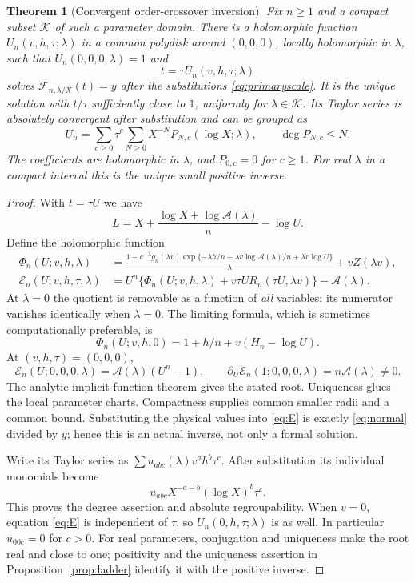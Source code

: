 \documentclass[11pt,a4paper]{article}
\numberwithin{equation}{section}
\newtheorem{theorem}{Theorem}[section]
\theoremstyle{definition}\newtheorem{definition}[theorem]{Definition}
\theoremstyle{remark}\newtheorem{remark}[theorem]{Remark}
\newcommand{\F}{\mathcal F}\newcommand{\B}{\mathcal B}
\newcommand{\A}{\mathcal A}\newcommand{\E}{\mathcal E}
\begin{document}
\begin{theorem}[Convergent order-crossover inversion]\label{thm:primary}
Fix $n\ge1$ and a compact subset $\mathscr K$ of such a parameter domain.
There is a holomorphic function $U_n(v,h,\tau;\lambda)$ in a common
polydisk around $(0,0,0)$, locally holomorphic in $\lambda$, such that
$U_n(0,0,0;\lambda)=1$ and
\begin{equation}\label{eq:primaryinverse}
 t=\tau U_n(v,h,\tau;\lambda)
\end{equation}
solves $\F_{n,\lambda/X}(t)=y$ after the substitutions
\eqref{eq:primaryscale}. It is the unique solution with $t/\tau$ sufficiently
close to $1$, uniformly for $\lambda\in\mathscr K$.
Its Taylor series is absolutely convergent after substitution and can be
grouped as
\begin{equation}\label{eq:primarysectors}
 U_n=\sum_{c\ge0}\tau^c\sum_{N\ge0}X^{-N}
           P_{N,c}(\log X;\lambda),\qquad \deg P_{N,c}\le N.
\end{equation}
The coefficients are holomorphic in $\lambda$, and $P_{0,c}=0$ for $c\ge1$.
For real $\lambda$ in a compact interval this is the unique small positive
inverse.
\end{theorem}
\begin{proof}
With $t=\tau U$ we have
\[
 L=X+\frac{\log X+\log\A(\lambda)}n-\log U.
\]
Define the holomorphic function
\begin{align}
 \Phi_n(U;v,h,\lambda)
 &=\frac{1-e^{-\lambda}g_n(\lambda v)
       \exp\{-\lambda h/n-\lambda v\log\A(\lambda)/n
                          +\lambda v\log U\}}{\lambda}
       +vZ(\lambda v),\label{eq:Phi}\\
 \E_n(U;v,h,\tau,\lambda)
 &=U^n\{\Phi_n(U;v,h,\lambda)
               +v\tau U R_n(\tau U,\lambda v)\}-\A(\lambda).
 \label{eq:E}
\end{align}
At $\lambda=0$ the quotient is removable as a function of \emph{all}
variables: its numerator vanishes identically when $\lambda=0$. The
limiting formula, which is sometimes computationally preferable, is
\begin{equation}\label{eq:Phi0}
 \Phi_n(U;v,h,0)=1+h/n+v(H_n-\log U).
\end{equation}
At $(v,h,\tau)=(0,0,0)$,
\[
 \E_n(U;0,0,0,\lambda)=\A(\lambda)(U^n-1),\qquad
 \partial_U\E_n(1;0,0,0,\lambda)=n\A(\lambda)\ne0.
\]
The analytic implicit-function theorem gives the stated root. Uniqueness
glues the local parameter charts. Compactness supplies common smaller
radii and a common bound. Substituting the physical values into
\eqref{eq:E} is exactly \eqref{eq:normal} divided by $y$; hence this is an
actual inverse, not only a formal solution.

Write its Taylor series as $\sum u_{abc}(\lambda)v^ah^b\tau^c$.
After substitution its individual monomials become
\[u_{abc}X^{-a-b}(\log X)^b\tau^c.\]
This proves the degree assertion and absolute regroupability. When $v=0$, equation \eqref{eq:E} is independent
of $\tau$, so $U_n(0,h,\tau;\lambda)$ is as well. In particular
$u_{00c}=0$ for $c>0$. For real parameters, conjugation and uniqueness make
the root real and close to one; positivity and the uniqueness assertion in
Proposition~\ref{prop:ladder} identify it with the positive inverse.
\end{proof}
\end{document}
